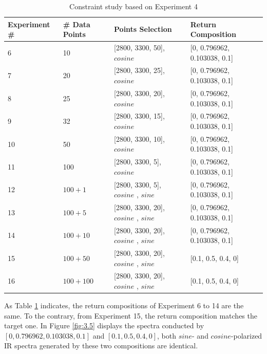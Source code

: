\begin{table} \small
\begin{center}
\begin{tabular}{| p{3cm} | p{3cm} | p{5cm} | l |} \hline
	Experiment \# & \# Data Points & Points Selection & Return Composition \\ \hline
	6 & 10 & [2800, 3300, 50], $cosine$ & [0, 0.796962, 0.103038, 0.1] \\ \hline
	7 & 20 & [2800, 3300, 25], $cosine$ & [0, 0.796962, 0.103038, 0.1] \\ \hline
	8 & 25 & [2800, 3300, 20], $cosine$ & [0, 0.796962, 0.103038, 0.1] \\ \hline
	9 & 32 & [2800, 3300, 15], $cosine$ & [0, 0.796962, 0.103038, 0.1] \\ \hline
	10 & 50 & [2800, 3300, 10], $cosine$ & [0, 0.796962, 0.103038, 0.1] \\ \hline
	11 & 100 & [2800, 3300, 5], $cosine$ & [0, 0.796962, 0.103038, 0.1] \\ \hline
	12 & $100 + 1$ & [2800, 3300, 5], $cosine$ \newline [2800, 3300, 500], $sine$ & [0, 0.796962, 0.103038, 0.1] \\ \hline
	13 & $100 + 5$ & [2800, 3300, 20], $cosine$ \newline [2800, 3300, 100], $sine$ & [0, 0.796962, 0.103038, 0.1] \\ \hline
	14 & $100 + 10$ & [2800, 3300, 20], $cosine$ \newline  [2800, 3300, 50], $sine$ & [0, 0.796962, 0.103038, 0.1] \\ \hline
	15 & $100 + 50$ & [2800, 3300, 20], $cosine$ \newline  [2800, 3300, 10], $sine$ & [0.1, 0.5, 0.4, 0] \\ \hline
	16 & $100 + 100$ & [2800, 3300, 20], $cosine$ \newline  [2800, 3300, 5], $sine$ & [0.1, 0.5, 0.4, 0] \\ 
	\hline
\end{tabular} 
\end{center}
\caption{Constraint study based on Experiment 4} \label{tab:3.4}
\end{table}

As Table \ref{tab:3.4} indicates, the return compositions of Experiment 6 to 14 are the same. To the contrary, from Experiment 15, the return composition matches the target one. In Figure \ref{fig:3.5} displays the spectra conducted by $[0, 0.796962, 0.103038, 0.1]$ and $[0.1, 0.5, 0.4, 0]$, both $sine$- and $cosine$-polarized IR spectra generated by these two compositions are identical.

